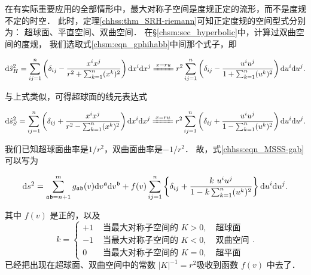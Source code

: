 在有实际重要应用的全部情形中，最大对称子空间是度规正定的流形，而不是度规不定的时空．
此时，定理\ref{chhss:thm_SRH-riemann}可知正定度规的空间型式分别为：
超球面、平直空间、双曲空间．
在\S\ref{chsm:sec_hyperbolic}中，计算过双曲空间的度规，
我们选取式\eqref{chsm:eqn_gphihabb}中间那个式子，即
\begin{small}
\setlength{\mathindent}{0em}
\begin{align*}
    {\rm d}\hat{s}^2_H= \sum_{ij=1}^{n}\left(\delta_{ij}-\frac{x^i x^j}{r^2+\sum_{k=1}^{n}(x^k)^2}\right) {\rm d} x^i {\rm d} x^j 
    \xlongequal{x=ru} r^2 \sum_{ij=1}^{n}\left(\delta_{ij}-\frac{ u^i u^j}{1+\sum_{k=1}^{n}(u^k)^2}\right)  {\rm d} u^i {\rm d} u^j .
\end{align*}\setlength{\mathindent}{2em}
\end{small}
与上式类似，可得超球面的线元表达式
\begin{small}
    \setlength{\mathindent}{0em}
\begin{align*}
    {\rm d}\hat{s}^2_S= \sum_{ij=1}^{n}\left(\delta_{ij}+\frac{x^i x^j}{r^2-\sum_{k=1}^{n}(x^k)^2}\right) {\rm d} x^i {\rm d} x^j 
    \xlongequal{x=ru} r^2 \sum_{ij=1}^{n}\left(\delta_{ij}+\frac{ u^i u^j}{1-\sum_{k=1}^{n}(u^k)^2}\right)  {\rm d} u^i {\rm d} u^j .
\end{align*} \setlength{\mathindent}{2em}
\end{small}
我们已知超球面曲率是$1/r^2$，双曲面曲率是$-1/r^2$．
故，式\eqref{chhss:eqn_MSSS-gab}可以写为
\begin{small}
\begin{equation}\label{chhss:eqn_pg-mss}
    \mathrm{d} s^2=\sum_{\mathfrak{ab}=n+1}^{m} 
    g_{\mathfrak{ab}}(v) {\rm d} v^{\mathfrak{a}} {\rm d} v^{\mathfrak{b}}
    +f(v) \sum_{ij=1}^{n} \left\{\delta_{ij} + \frac{k \ u^i u^j}{1-k \sum_{k=1}^{n}(u^k)^2}\right\} 
    {\rm d} u^i {\rm d} u^j.
\end{equation}
\end{small}
其中 $f(v)$ 是正的，以及
\begin{equation}
    k= \begin{cases}
        +1 & \text { 当最大对称子空间的 } K>0 ,\quad \text{超球面} \\ 
        -1 & \text { 当最大对称子空间的 } K<0 ,\quad \text{双曲空间} \\ 
        0  & \text { 当最大对称子空间的 } K=0 ,\quad \text{超平面}
        \end{cases} .
\end{equation}
已经把出现在超球面、双曲空间中的常数 $|K|^{-1}=r^2$吸收到函数 $f(v)$ 中去了．

